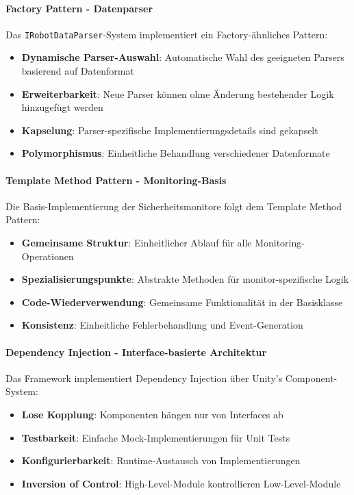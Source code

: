 \paragraph{Factory Pattern - Datenparser}
Das \texttt{IRobotDataParser}-System implementiert ein Factory-ähnliches
Pattern:

\begin{itemize}
    \item \textbf{Dynamische Parser-Auswahl}: Automatische Wahl des geeigneten Parsers basierend auf Datenformat
    \item \textbf{Erweiterbarkeit}: Neue Parser können ohne Änderung bestehender Logik hinzugefügt werden
    \item \textbf{Kapselung}: Parser-spezifische Implementierungsdetails sind gekapselt
    \item \textbf{Polymorphismus}: Einheitliche Behandlung verschiedener Datenformate
\end{itemize}

\paragraph{Template Method Pattern - Monitoring-Basis}
Die Basis-Implementierung der Sicherheitsmonitore folgt dem Template Method
Pattern:

\begin{itemize}
    \item \textbf{Gemeinsame Struktur}: Einheitlicher Ablauf für alle Monitoring-Operationen
    \item \textbf{Spezialisierungspunkte}: Abstrakte Methoden für monitor-spezifische Logik
    \item \textbf{Code-Wiederverwendung}: Gemeinsame Funktionalität in der Basisklasse
    \item \textbf{Konsistenz}: Einheitliche Fehlerbehandlung und Event-Generation
\end{itemize}

\paragraph{Dependency Injection - Interface-basierte Architektur}
Das Framework implementiert Dependency Injection über Unity's Component-System:

\begin{itemize}
    \item \textbf{Lose Kopplung}: Komponenten hängen nur von Interfaces ab
    \item \textbf{Testbarkeit}: Einfache Mock-Implementierungen für Unit Tests
    \item \textbf{Konfigurierbarkeit}: Runtime-Austausch von Implementierungen
    \item \textbf{Inversion of Control}: High-Level-Module kontrollieren Low-Level-Module
\end{itemize}

